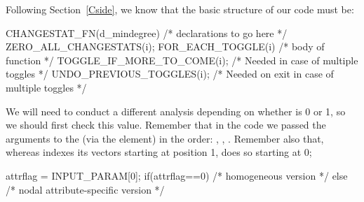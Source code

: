 \documentclass[nojss]{jss}
\begin{document}
Following Section~\ref{Cside}, we know that the basic structure of our
 code must be:
\begin{CodeChunk}
\begin{CodeInput}
CHANGESTAT_FN(d_mindegree) {
  /* declarations to go here */
  ZERO_ALL_CHANGESTATS(i);
  FOR_EACH_TOGGLE(i) {
    /* body of function */
    TOGGLE_IF_MORE_TO_COME(i); /* Needed in case of multiple toggles */
  }
  UNDO_PREVIOUS_TOGGLES(i); /* Needed on exit in case of multiple toggles */
}
\end{CodeInput}
\end{CodeChunk}

We will need to conduct a different analysis depending on whether
 is 0 or 1, so we should first check this value. Remember that in
the  code we passed the arguments to the  (via the
 element) in the order: , ,
.
Remember also that, whereas
 indexes its vectors starting at position 1,  does so
starting at 0;
\begin{CodeChunk}
\begin{CodeInput}
  attrflag = INPUT_PARAM[0];
  if(attrflag==0){
    /* homogeneous version */
  }else{
    /* nodal attribute-specific version */
  }
\end{CodeInput}
\end{CodeChunk}
\end{document}

